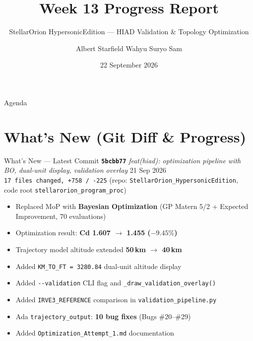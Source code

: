 \documentclass[aspectratio=169,10pt]{beamer}
\title[Week 13 Progress]{Week 13 Progress Report}
\subtitle{StellarOrion HypersonicEdition --- HIAD Validation \& Topology Optimization}
\author{Albert Starfield Wahyu Suryo Sam}
\institute{StellarOrion HypersonicEdition}
\date{22 September 2026}
\begin{document}
\begin{frame}
  \titlepage
\end{frame}

\begin{frame}{Agenda}
  \tableofcontents
\end{frame}

\section{What's New (Git Diff \& Progress)}

\begin{frame}{What's New --- Latest Commit}
  \textbf{\texttt{5bcbb77}} \emph{feat(hiad): optimization pipeline with BO,
  dual-unit display, validation overlay} \hfill 21 Sep 2026\\[2pt]
  \texttt{17 files changed, +758 / -225} (repo:
  \texttt{StellarOrion\_HypersonicEdition}, code root
  \texttt{stellarorion\_program\_proc})\\[4pt]
  \begin{itemize}
    \item Replaced MoP with \textbf{Bayesian Optimization}
          (GP Matern 5/2 + Expected Improvement, 70 evaluations)
    \item Optimization result: \textbf{Cd 1.607 $\rightarrow$ 1.455
          ($-9.45\%$)}
    \item Trajectory model altitude extended \textbf{50\,km $\rightarrow$ 40\,km}
    \item Added \texttt{KM\_TO\_FT = 3280.84} dual-unit altitude display
    \item Added \texttt{-{}-validation} CLI flag and
          \texttt{\_draw\_validation\_overlay()}
    \item Added \texttt{IRVE3\_REFERENCE} comparison in
          \texttt{validation\_pipeline.py}
    \item Ada \texttt{trajectory\_output}: \textbf{10 bug fixes}
          (Bugs \#20--\#29)
    \item Added \texttt{Optimization\_Attempt\_1.md} documentation
  \end{itemize}
\end{frame}
\end{document}
